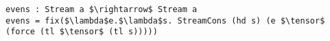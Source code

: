 \begin{lstlisting}[mathescape]
evens : Stream a $\rightarrow$ Stream a
evens = fix($\lambda$e.$\lambda$s. StreamCons (hd s) (e $\tensor$ (force (tl $\tensor$ (tl s)))))
\end{lstlisting}
